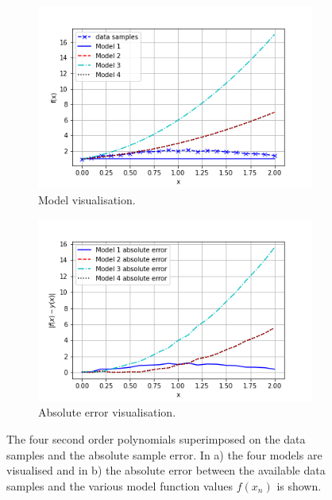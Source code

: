 \documentclass{article}
\begin{document}
\begin{figure}[!htb]
     \centering
     \begin{subfigure}[b]{0.45\textwidth}
         \centering
         \includegraphics[width=\textwidth]{Q2a_fig1.png}
         \caption{Model visualisation.}
     \end{subfigure}
     \hfill
     \begin{subfigure}[b]{0.45\textwidth}
         \centering
         \includegraphics[width=\textwidth]{Q2a_fig2.png}
         \caption{Absolute error visualisation.}
     \end{subfigure}
        \caption{The four second order polynomials superimposed on the data samples and the absolute sample error. In a) the four models are visualised and in b) the  absolute error between the available data samples and the various model function values $f(x_n)$ is shown.}
        \label{fig:Q2a_1}
\end{figure}
\end{document}
